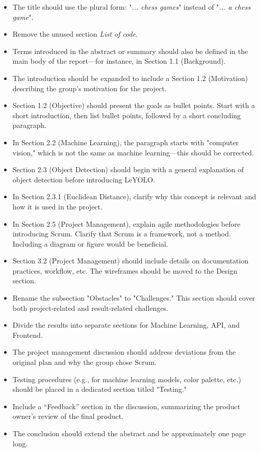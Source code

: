\begin{itemize}
    \item The title should use the plural form: "\textit{... chess games}" instead of "\textit{... a chess game}".
    \item Remove the unused section \textit{List of code}.
    \item Terms introduced in the abstract or summary should also be defined in the main body of the report—for instance, in Section 1.1 (Background).
    \item The introduction should be expanded to include a Section 1.2 (Motivation) describing the group’s motivation for the project.
    \item Section 1.2 (Objective) should present the goals as bullet points. Start with a short introduction, then list bullet points, followed by a short concluding paragraph.
    \item In Section 2.2 (Machine Learning), the paragraph starts with "computer vision," which is not the same as machine learning—this should be corrected.
    \item Section 2.3 (Object Detection) should begin with a general explanation of object detection before introducing LeYOLO.
    \item In Section 2.3.1 (Euclidean Distance), clarify why this concept is relevant and how it is used in the project.
    \item In Section 2.5 (Project Management), explain agile methodologies before introducing Scrum. Clarify that Scrum is a framework, not a method. Including a diagram or figure would be beneficial.
    \item Section 3.2 (Project Management) should include details on documentation practices, workflow, etc. The wireframes should be moved to the Design section.
    \item Rename the subsection "Obstacles" to "Challenges." This section should cover both project-related and result-related challenges.
    \item Divide the results into separate sections for Machine Learning, API, and Frontend.
    \item The project management discussion should address deviations from the original plan and why the group chose Scrum.
    \item Testing procedures (e.g., for machine learning models, color palette, etc.) should be placed in a dedicated section titled "Testing."
    \item Include a “Feedback” section in the discussion, summarizing the product owner's review of the final product.
    \item The conclusion should extend the abstract and be approximately one page long.
\end{itemize}

